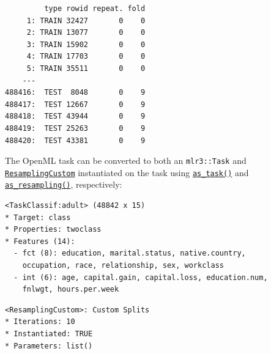 \begin{Shaded}
\begin{Highlighting}[]
\SpecialCharTok{$}
\end{Highlighting}
\end{Shaded}

\begin{verbatim}
         type rowid repeat. fold
     1: TRAIN 32427       0    0
     2: TRAIN 13077       0    0
     3: TRAIN 15902       0    0
     4: TRAIN 17703       0    0
     5: TRAIN 35511       0    0
    ---                         
488416:  TEST  8048       0    9
488417:  TEST 12667       0    9
488418:  TEST 43944       0    9
488419:  TEST 25263       0    9
488420:  TEST 43381       0    9
\end{verbatim}

The OpenML task can be converted to both an \texttt{mlr3::Task} and
\href{https://mlr3.mlr-org.com/reference/ResamplingCustom.html}{\texttt{ResamplingCustom}}
instantiated on the task using
\href{https://mlr3.mlr-org.com/reference/as_task.html}{\texttt{as\_task()}}
and
\href{https://mlr3.mlr-org.com/reference/as_resampling.html}{\texttt{as\_resampling()}},
respectively:

\begin{Shaded}
\begin{Highlighting}[]
\OtherTok{=} 
\end{Highlighting}
\end{Shaded}

\begin{verbatim}
<TaskClassif:adult> (48842 x 15)
* Target: class
* Properties: twoclass
* Features (14):
  - fct (8): education, marital.status, native.country,
    occupation, race, relationship, sex, workclass
  - int (6): age, capital.gain, capital.loss, education.num,
    fnlwgt, hours.per.week
\end{verbatim}

\begin{Shaded}
\begin{Highlighting}[]
\OtherTok{=} 
\end{Highlighting}
\end{Shaded}

\begin{verbatim}
<ResamplingCustom>: Custom Splits
* Iterations: 10
* Instantiated: TRUE
* Parameters: list()
\end{verbatim}

